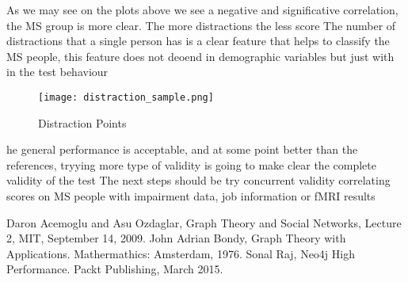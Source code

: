 \documentclass[letterpaper, 10 pt, conference]{ieeeconf}
\begin{document}
As we may see on the plots above we see a negative and significative correlation, the MS group is more clear. The more distractions the less score
The number of distractions that a single person has is a clear feature that helps to classify the MS people, this feature does not deoend in demographic variables but just with in the test behaviour
\begin{figure}[ht]
\texttt{[image: distraction\_sample.png]}
\caption{Distraction Points}
\label{tab:dis}
\end{figure}

he general performance is acceptable, and at some point better than the references, tryying more type of validity is going to make clear the complete validity of the test
The next steps should be try concurrent validity correlating scores on MS people with impairment data, job information or fMRI results











\begin{thebibliography}{10}

 Daron Acemoglu and Asu Ozdaglar, Graph Theory and Social Networks, Lecture 2, MIT, September 14, 2009.
 John Adrian Bondy, Graph Theory with Applications.	Mathermathics: Amsterdam, 1976.
 Sonal Raj, Neo4j High Performance.	Packt Publishing, March 2015.
\end{thebibliography}
\end{document}
